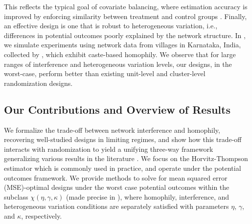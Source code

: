 \documentclass[12pt]{article}
\theoremstyle{definition}
\numberwithin{equation}{section}
\numberwithin{figure}{section}
\numberwithin{equation}{section}
\numberwithin{figure}{section}
\begin{document}
This reflects the typical goal of covariate balancing, where estimation accuracy is improved by enforcing similarity between treatment and control groups \citep{efron1971forcing}. Finally, an effective design is one that is robust to heterogeneous variation, i.e., differences in potential outcomes poorly explained by the network structure. In , we simulate experiments using network data from villages in Karnataka, India, collected by \citet{banerjee2013diffusion}, which exhibit caste-based homophily. We observe that for large ranges of interference and heterogeneous variation levels, our designs, in the worst-case, perform better than existing unit-level and cluster-level randomization designs. 
 
\subsection{Our Contributions and Overview of Results}
We formalize the trade-off between network interference and homophily, recovering well-studied designs in limiting regimes, and show how this trade-off interacts with randomization to yield a unifying three-way framework generalizing various results in the literature \citep{harshaw2024balancing, viviano2023causal}.
We focus on the Horvitz-Thompson estimator which is commonly used in practice, and operate under the potential outcomes framework. We provide methods to solve for mean squared error (MSE)-optimal designs under the worst case potential outcomes within the subclass $\chi(\eta, \gamma, \kappa)$ (made precise in ), where homophily, interference, and heterogeneous variation conditions 
are separately satisfied with parameters $\eta$, $\gamma$, and $\kappa$, respectively.
\end{document}
